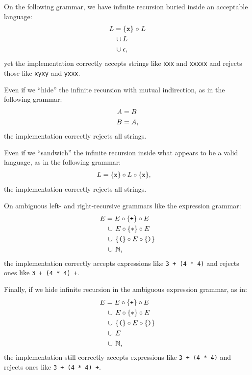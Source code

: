 \begin{example}
On the following grammar, we have infinite recursion buried inside an acceptable language:
\begin{align*}
  L &=  \left\{\tt x\right\} \mathrel{\circ} L 
  \\
    &\,\cup L
  \\
    &\,\cup \epsilon
  \text,
\end{align*}
yet the implementation correctly accepts strings like {\tt xxx} and {\tt xxxxx} and rejects 
those like {\tt xyxy} and {\tt yxxx}.
\end{example}


\begin{example}
Even if we ``hide'' the infinite recursion with mutual indirection,
as in the following grammar:
\begin{align*}
  A &=  B
  \\
  B &=  A
  \text,
\end{align*}
%
the implementation correctly rejects all strings.
\end{example}


\begin{example}
Even if we ``sandwich'' the infinite recursion
inside what appears to be a valid language, as in the following grammar:
\begin{align*}
  L &= \{{\tt x}\} \circ L \circ \{{\tt x}\}
  \text,
\end{align*}
%
the implementation correctly rejects all strings.
\end{example}

\begin{example}
On ambiguous left- and right-recursive grammars like the expression grammar:
\begin{align*}
  E &= E \circ \{{\mbox{\tt +}}\} \circ E
  \\
  &\,\cup\,  E \circ \{{\tt *}\} \circ E
  \\
  &\,\cup\,  \{{\mbox{\tt (}}\} \circ E \circ \{\mbox{\tt )}\}
  \\
  &\,\cup\, {\mathbb{N}} 
  \text,
\end{align*}
the implementation correctly accepts expressions like {\tt 3 + (4 * 4)}
and rejects ones like {\tt 3 + (4 * 4) +}.
\end{example}

\begin{example}
Finally, if we hide infinite recursion in the ambiguous expression grammar, as in:
\begin{align*}
  E &= E \circ \{{\mbox{\tt +}}\} \circ E
  \\
  &\,\cup\,  E \circ \{{\tt *}\} \circ E
  \\
  &\,\cup\,  \{{\mbox{\tt (}}\} \circ E \circ \{\mbox{\tt )}\}
  \\
  &\,\cup\,  E 
  \\
  &\,\cup\, {\mathbb{N}} 
  \text,
\end{align*}
the implementation still correctly accepts expressions like {\tt 3 + (4 * 4)}
and rejects ones like {\tt 3 + (4 * 4) +}.
\end{example}




